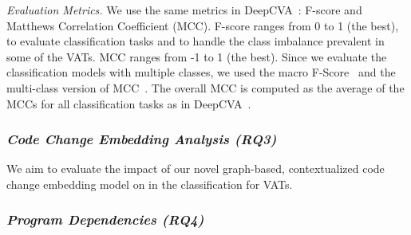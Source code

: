 \emph{Evaluation Metrics.} We use the same metrics in
DeepCVA~\cite{deepCVA-ase21}: F-score and Matthews Correlation
Coefficient (MCC). F-score ranges from 0 to 1 (the best), to evaluate
classification tasks and to handle the class imbalance prevalent in
some of the VATs. MCC ranges from -1 to 1 (the best).
Since we evaluate the classification models with multiple classes,
we used the macro F-Score~\cite{spanos2018multi} and the multi-class
version of MCC~\cite{gorodkin04}. The overall MCC is computed as the
average of the MCCs for all classification tasks as in
DeepCVA~\cite{deepCVA-ase21}.









\subsubsection{\bf \em Code Change Embedding Analysis (RQ3)}

We aim to evaluate the impact of our novel graph-based, contextualized
code change embedding model on {\tool} in the
classification for VATs.


\subsubsection{\bf \em Program Dependencies (RQ4)}

